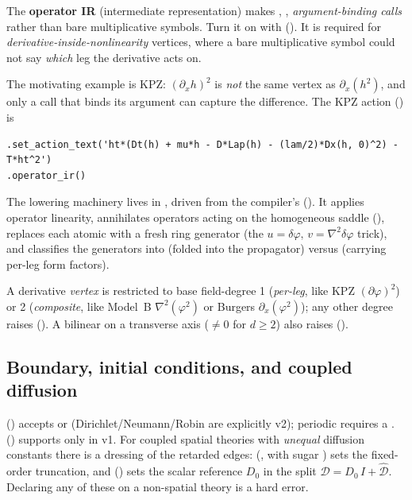 \begin{defn}
The \textbf{operator IR} (intermediate representation) makes ,
,  \emph{argument-binding calls} rather than bare
multiplicative symbols. Turn it on with 
(). It is required for
\emph{derivative-inside-nonlinearity} vertices, where a bare multiplicative symbol
could not say \emph{which} leg the derivative acts on.
\end{defn}

The motivating example is KPZ: $(\partial_x h)^{2}$ is \emph{not} the same vertex
as $\partial_x(h^{2})$, and only a call that binds its argument can capture the
difference. The KPZ action () is

\begin{lstlisting}
.set_action_text('ht*(Dt(h) + mu*h - D*Lap(h) - (lam/2)*Dx(h, 0)^2) - T*ht^2')
.operator_ir()
\end{lstlisting}

The lowering machinery lives in , driven
from the compiler's 
(). It applies operator linearity,
annihilates operators acting on the homogeneous saddle (),
replaces each atomic  with a fresh ring generator (the
$u=\delta\varphi,\,v=\nabla^{2}\delta\varphi$ trick), and classifies the
generators into  (folded into the propagator) versus 
(carrying per-leg form factors).

\begin{gotcha}
A derivative \emph{vertex} is restricted to base field-degree 1 (\emph{per-leg},
like KPZ $(\partial\varphi)^{2}$) or 2 (\emph{composite}, like Model~B
$\nabla^{2}(\varphi^{2})$ or Burgers $\partial_x(\varphi^{2})$); any other degree
raises  (). A
bilinear  on a transverse axis ($\ne 0$ for $d\ge 2$) also raises
().
\end{gotcha}

\subsection{Boundary, initial conditions, and coupled diffusion}

 () accepts
 or  (Dirichlet/Neumann/Robin are explicitly
v2); periodic requires a . 
() supports only  in v1. For
coupled spatial theories with \emph{unequal} diffusion constants there is a
 dressing of the retarded edges: 
(, with sugar ) sets the
fixed-order truncation, and 
() sets the scalar reference $D_0$ in the split
$\mathcal{D} = D_0\,I + \hat{\mathcal{D}}$. Declaring any of these on a non-spatial
theory is a hard error.


